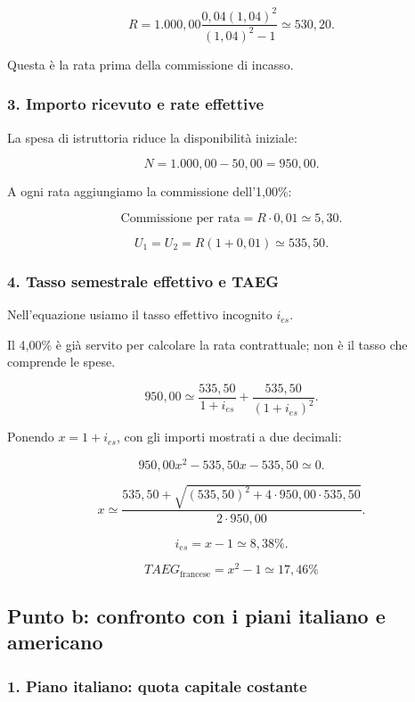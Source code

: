 \[
R=
1.000{,}00
\frac{
0{,}04(1{,}04)^2
}{
(1{,}04)^2-1
}
\simeq
\boxed{530{,}20}.
\]

\noindent Questa è la rata prima
della commissione di incasso.


\subsubsection*{3. Importo ricevuto e rate effettive}

\noindent La spesa di istruttoria
riduce la disponibilità iniziale:

\[
N=1.000{,}00-50{,}00=\boxed{950{,}00}.
\]

\noindent A ogni rata aggiungiamo
la commissione dell'1,00\%:

\[
\text{Commissione per rata}
=
R\cdot0{,}01
\simeq5{,}30.
\]

\[
U_1=U_2=R(1+0{,}01)\simeq\boxed{535{,}50}.
\]


\subsubsection*{4. Tasso semestrale effettivo e TAEG}

\noindent Nell'equazione usiamo
il tasso effettivo incognito $i_{es}$.

\noindent Il 4,00\% è già servito
per calcolare la rata contrattuale;
non è il tasso che comprende le spese.

\[
950{,}00
\simeq
\frac{535{,}50}{1+i_{es}}
+
\frac{535{,}50}{(1+i_{es})^2}.
\]

\noindent Ponendo $x=1+i_{es}$,
con gli importi mostrati a due decimali:

\[
950{,}00x^2-535{,}50x-535{,}50\simeq0.
\]

\[
x\simeq
\frac{
535{,}50+
\sqrt{(535{,}50)^2+4\cdot950{,}00\cdot535{,}50}
}{
2\cdot950{,}00
}.
\]

\[
i_{es}=x-1\simeq\boxed{8{,}38\%}.
\]

\[
\boxed{
TAEG_{\text{francese}}=x^2-1\simeq17{,}46\%
}
\]


\subsection*{Punto b: confronto con i piani italiano e americano}

\subsubsection*{1. Piano italiano: quota capitale costante}


